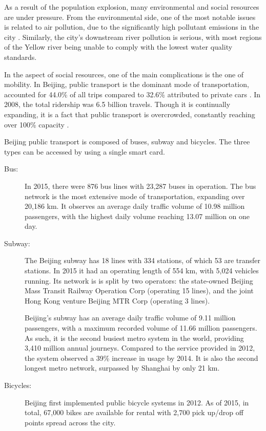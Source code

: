 \documentclass{article}
\begin{document}
As a result of the population explosion, many environmental and social resources are under pressure. From the environmental side, one of the most notable issues is related to air pollution, due to the significantly high pollutant emissions in the city \cite{zhang2016air}. Similarly, the city's downstream river pollution is serious, with most regions of the Yellow river being unable to comply with the lowest water quality standards. \cite{wang2015studies} 

In the aspect of social resources, one of the main complications is the one of mobility. In Beijing, public transport is the dominant mode of transportation, accounted for 44.0\% of all trips compared to 32.6\% attributed to private cars \cite{mao2016commuting}. In 2008, the total ridership was 6.5 billion travels. Though it is continually expanding, it is a fact that public transport is overcrowded, constantly reaching over 100\% capacity \cite{beijing2009research}.

Beijing public transport is composed of buses, subway and bicycles. The three types can be accessed by using a single smart card. 

\begin{description}
\item[Bus:] In 2015, there were 876 bus lines with 23,287 buses in operation. The bus network is the most extensive mode of transportation, expanding over 20,186 km. It observes an average daily traffic volume of 10.98 million passengers, with the highest daily volume reaching 13.07 million on one day. \cite{beijing2016annual}

\item[Subway:] The Beijing subway has 18 lines with 334 stations, of which 53 are transfer stations. In 2015 it had an operating length of 554 km, with 5,024 vehicles running. \cite{beijing2016annual} Its network is is split by two operators: the state-owned Beijing Mass Transit Railway Operation Corp (operating 15 lines), and the joint Hong Kong venture Beijing MTR Corp (operating 3 lines).

Beijing's subway has an average daily traffic volume of 9.11 million passengers, with a maximum recorded volume of 11.66 million passengers. As such, it is the second busiest metro system in the world, providing 3,410 million annual journeys. Compared to the service provided in 2012, the system observed a 39\% increase in usage by 2014. It is also the second longest metro network, surpassed by Shanghai by only 21 km.  \cite{uitp2015world} 

\item[Bicycles:] Beijing first implemented public bicycle systems in 2012. As of 2015, in total, 67,000 bikes are available for rental with 2,700 pick up/drop off points spread across the city. \cite{beijing2016annual}
\end{description}
\end{document}

